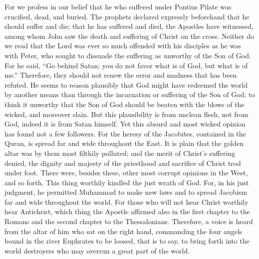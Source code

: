 For we profess in our belief that he who suffered under Pontius Pilate was crucified, dead, and buried. The prophets declared expressly beforehand that he should suffer and die; that he has suffered and died, the Apostles have witnessed, among whom John saw the death and suffering of Christ on the cross. Neither do we read that the Lord was ever so much offended with his disciples as he was with Peter, who sought to dissuade the suffering as unworthy of the Son of God. For he said, “Go behind Satan; you do not favor what is of God, but what is of me.” Therefore, they should not renew the error and madness that has been refuted. He seems to reason plausibly that God might have redeemed the world by another means than through the incarnation or suffering of the Son of God; to think it unworthy that the Son of God should be beaten with the blows of the wicked, and moreover slain. But this plausibility is from unclean flesh, not from God, indeed it is from Satan himself. Yet this absurd and most wicked opinion has found not a few followers. For the heresy of the Jacobites, contained in the Quran, is spread far and wide throughout the East. It is plain that the golden altar was by them most filthily polluted; and the merit of Christ’s suffering denied, the dignity and majesty of the priesthood and sacrifice of Christ trod under foot. There were, besides these, other most corrupt opinions in the West, and so forth. This thing worthily kindled the just wrath of God. For, in his just judgment, he permitted Muhammad to make new laws and to spread Jacobism far and wide throughout the world. For those who will not hear Christ worthily hear Antichrist, which thing the Apostle affirmed also in the first chapter to the Romans and the second chapter to the Thessalonians. Therefore, a voice is heard from the altar of him who sat on the right hand, commanding the four angels bound in the river Euphrates to be loosed, that is to say, to bring forth into the world destroyers who may overrun a great part of the world.

